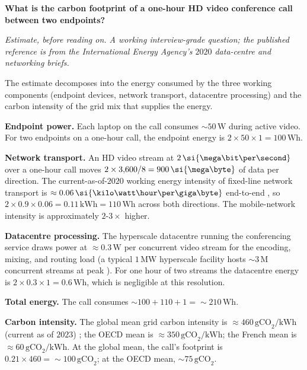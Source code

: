 \begin{estimation}
\textbf{What is the carbon footprint of a one-hour HD video
conference call between two endpoints?}

\smallskip
\textit{Estimate, before reading on. A working interview-grade
question; the published reference is from the International
Energy Agency's $2020$ data-centre and networking briefs.}

\smallskip
The estimate decomposes into the energy consumed by the three
working components (endpoint devices, network transport,
datacentre processing) and the carbon intensity of the grid mix
that supplies the energy.

\textbf{Endpoint power.} Each laptop on the call consumes
$\sim 50 \,\si{\watt}$ during active video. For two endpoints
on a one-hour call, the endpoint energy is $2 \times 50 \times
1 = 100 \,\si{\watt\hour}$.

\textbf{Network transport.} An HD video stream at $2 \,
\si{\mega\bit\per\second}$ over a one-hour call moves
$2 \times 3{,}600 / 8 = 900 \,\si{\mega\byte}$ of data per
direction. The current-as-of-$2020$ working energy intensity of
fixed-line network transport is $\approx 0.06 \,
\si{\kilo\watt\hour\per\giga\byte}$ end-to-end
\cite{data:ch09t3b-iea-data-2020}, so $2 \times 0.9 \times 0.06
= 0.11 \,\si{\kilo\watt\hour} = 110 \,\si{\watt\hour}$ across
both directions. The mobile-network intensity is approximately
$2$-$3 \times$ higher.

\textbf{Datacentre processing.} The hyperscale datacentre
running the conferencing service draws power at $\approx 0.3 \,
\si{\watt}$ per concurrent video stream for the encoding,
mixing, and routing load (a typical $1 \,\si{\mega\watt}$
hyperscale facility hosts $\sim 3 \,\text{M}$ concurrent streams
at peak \cite{data:ch09t3b-iea-data-2020}). For one hour of two
streams the datacentre energy is $2 \times 0.3 \times 1 = 0.6
\,\si{\watt\hour}$, which is negligible at this resolution.

\textbf{Total energy.} The call consumes $\sim 100 + 110 + 1 =
\sim 210 \,\si{\watt\hour}$.

\textbf{Carbon intensity.} The global mean grid carbon
intensity is $\approx 460 \,\text{gCO}_{2}/\text{kWh}$
(current as of $2023$) \cite{data:ch09t3b-ember-2024}; the OECD
mean is $\approx 350 \,\text{gCO}_{2}/\text{kWh}$;
the French mean is $\approx 60 \,\text{gCO}_{2}/\text{kWh}$.
At the global mean, the call's footprint is $0.21 \times 460 =
\sim 100 \,\text{gCO}_{2}$; at the OECD mean,
$\sim 75 \,\text{gCO}_{2}$.


\end{estimation}
